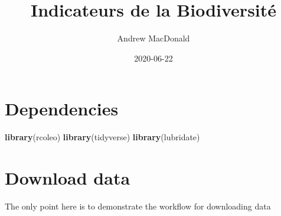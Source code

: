 \documentclass[
]{book}
\title{Indicateurs de la Biodiversité}
\author{Andrew MacDonald}
\date{2020-06-22}
\newenvironment{Shaded}{\begin{snugshade}}{\end{snugshade}}
\newcommand{\KeywordTok}[1]{\textcolor[rgb]{0.13,0.29,0.53}{\textbf{#1}}}
\newcommand{\NormalTok}[1]{#1}
\begin{document}
\maketitle

{
\setcounter{tocdepth}{1}
\tableofcontents
}
\hypertarget{dependencies}{%
\chapter{Dependencies}\label{dependencies}}

\begin{Shaded}
\begin{Highlighting}[]
\KeywordTok{library}\NormalTok{(rcoleo)}
\KeywordTok{library}\NormalTok{(tidyverse)}
\KeywordTok{library}\NormalTok{(lubridate)}
\end{Highlighting}
\end{Shaded}

\hypertarget{dl}{%
\chapter{Download data}\label{dl}}

The only point here is to demonstrate the workflow for downloading data
\end{document}
